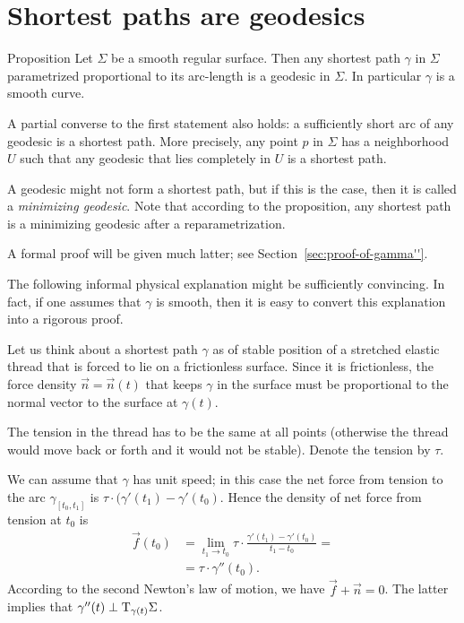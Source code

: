 \section{Shortest paths are geodesics}

\begin{thm}{Proposition}\label{prop:gamma''}
Let $\Sigma$ be a smooth regular surface.
Then any shortest path $\gamma$ in $\Sigma$ parametrized proportional to its arc-length is a geodesic in $\Sigma$.
In particular $\gamma$ is a smooth curve.

A partial converse to the first statement also holds: a sufficiently short arc of any geodesic is a shortest path.
More precisely, any point $p$ in $\Sigma$ has a neighborhood $U$ such that any geodesic that lies completely in $U$ is a shortest path.
\end{thm}

A geodesic might not form a shortest path, but if this is the case, then it is called a \emph{minimizing geodesic}.
Note that according to the proposition, any shortest path is a minimizing geodesic after a reparametrization.

A formal proof will be given much latter; see Section~\ref{sec:proof-of-gamma''}.

The following informal physical explanation might be sufficiently convincing.
In fact, if one assumes that $\gamma$ is smooth, then it is easy to convert this explanation into a rigorous proof.

Let us think about a shortest path $\gamma$ as of stable position of a stretched elastic thread that is forced to lie on a frictionless surface.
Since it is frictionless, the force density $\vec n=\vec n(t)$ that keeps $\gamma$ in the surface must be proportional to the normal vector to the surface at $\gamma(t)$.

The tension in the thread has to be the same at all points (otherwise the thread would move back or forth and it would not be stable).
Denote the tension by $\tau$.

We can assume that $\gamma$ has unit speed;
in this case the net force from tension to the arc $\gamma_{[t_0,t_1]}$ is $\tau\cdot(\gamma'(t_1)-\gamma'(t_0)$.
Hence the density of net force from tension at $t_0$ is 
\begin{align*}
\vec f(t_0)&=\lim_{t_1\to t_0}\tau\cdot\frac{\gamma'(t_1)-\gamma'(t_0)}{t_1-t_0}=
\\
&=\tau\cdot\gamma''(t_0).
\end{align*}
According to the second Newton's law of motion, we have 
$\vec f+\vec n=0$.
The latter implies that  $\gamma''(t)\perp\mathrm{T}_{\gamma(t)}\Sigma$.
\qeds

